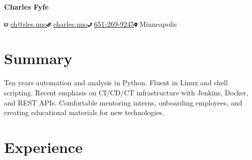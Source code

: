 \documentclass[12pt,letterpaper]{article}
\makeatletter
\newcommand{\ResumeSection}[1]{\section*{{\color{MidnightBlue}#1 \sout{\hfill}}}}
\newcommand{\hbump}{\hspace{0.4in}}
\newcommand{\hbmp}{\hspace{0.02in}}
\newcommand{\iconsize}{8px}
\newcommand{\emailtag}{\includegraphics[height=\iconsize]{icons/envelope-regular.pdf} \hbmp \href{mailto:ch@rles.uno}{ch@rles.uno}}
\newcommand{\webtag}{\includegraphics[height=\iconsize]{icons/link-solid.pdf} \hbmp \href{www.charles.uno}{charles.uno}}
\newcommand{\phonetag}{\includegraphics[height=\iconsize]{icons/phone-solid.pdf} \hbmp \href{tel:+16512699245}{651-269-9245}}
\newcommand{\citytag}{\includegraphics[height=\iconsize]{icons/map-marker-alt-solid.pdf} \hbmp Minneapolis}
\makeatother
\begin{document}
\begin{center}

    { \huge \textbf{Charles Fyfe} }

    \vspace{15pt}

    \emailtag \hbump \webtag \hbump \phonetag \hbump \citytag

    \vspace{20pt}

\end{center}


\ResumeSection{Summary}

Ten years automation and analysis in Python. Fluent in Linux and shell scripting. Recent emphasis on CI/CD/CT infrastructure with Jenkins, Docker, and REST APIs. Comfortable mentoring interns, onboarding employees, and creating educational materials for new technologies.

\ResumeSection{Experience}
\end{document}
